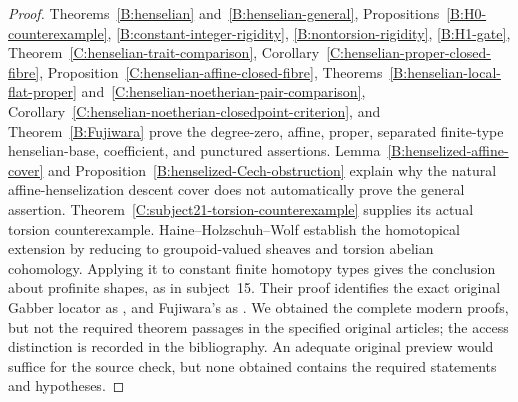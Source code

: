 \begin{proof}
Theorems~\ref{B:henselian} and~\ref{B:henselian-general}, Propositions~\ref{B:H0-counterexample}, \ref{B:constant-integer-rigidity}, \ref{B:nontorsion-rigidity}, \ref{B:H1-gate}, Theorem~\ref{C:henselian-trait-comparison}, Corollary~\ref{C:henselian-proper-closed-fibre}, Proposition~\ref{C:henselian-affine-closed-fibre}, Theorems~\ref{B:henselian-local-flat-proper} and~\ref{C:henselian-noetherian-pair-comparison}, Corollary~\ref{C:henselian-noetherian-closedpoint-criterion}, and Theorem~\ref{B:Fujiwara} prove the degree-zero, affine, proper, separated finite-type henselian-base, coefficient, and punctured assertions. Lemma~\ref{B:henselized-affine-cover} and Proposition~\ref{B:henselized-Cech-obstruction} explain why the natural affine-henselization descent cover does not automatically prove the general assertion. Theorem~\ref{C:subject21-torsion-counterexample} supplies its actual torsion counterexample. Haine--Holzschuh--Wolf \cite[Corollaries 2.34 and 2.36]{BHHW2024} establish the homotopical extension by reducing to groupoid-valued sheaves and torsion abelian cohomology. Applying it to constant finite homotopy types gives the conclusion about profinite shapes, as in subject~15. Their proof identifies the exact original Gabber locator as \cite[\S5, Corollary 1]{BGabber1994}, and Fujiwara's as \cite[Corollary 6.6.4]{BFujiwara1995}. We obtained the complete modern proofs, but not the required theorem passages in the specified original articles; the access distinction is recorded in the bibliography. An adequate original preview would suffice for the source check, but none obtained contains the required statements and hypotheses.
\end{proof}

